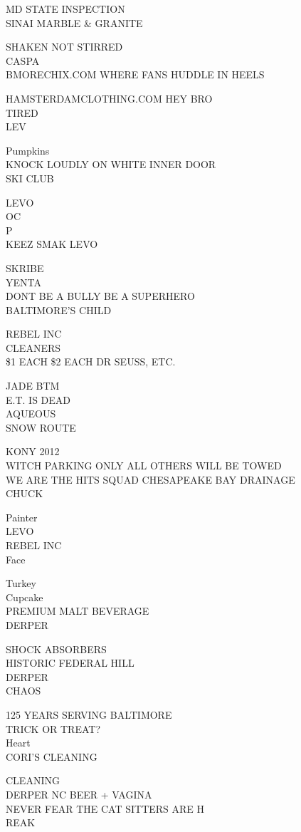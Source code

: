 \documentclass[10pt,letterpaper]{article}
\begin{document}
MD STATE INSPECTION\\
SINAI MARBLE \& GRANITE

SHAKEN NOT STIRRED\\
CASPA\\
BMORECHIX.COM WHERE FANS HUDDLE IN HEELS

HAMSTERDAMCLOTHING.COM HEY BRO\\
TIRED\\
LEV

Pumpkins\\
KNOCK LOUDLY ON WHITE INNER DOOR\\
SKI CLUB

LEVO\\
OC\\
P\\
KEEZ SMAK LEVO

SKRIBE\\
YENTA\\
DONT BE A BULLY BE A SUPERHERO\\
BALTIMORE'S CHILD

REBEL INC\\
CLEANERS\\
\$1 EACH \$2 EACH DR SEUSS, ETC.

JADE BTM\\
E.T. IS DEAD\\
AQUEOUS\\
SNOW ROUTE

KONY 2012\\
WITCH PARKING ONLY ALL OTHERS WILL BE TOWED\\
WE ARE THE HITS SQUAD CHESAPEAKE BAY DRAINAGE\\
CHUCK

Painter\\
LEVO\\
REBEL INC\\
Face

Turkey\\
Cupcake\\
PREMIUM MALT BEVERAGE\\
DERPER

SHOCK ABSORBERS\\
HISTORIC FEDERAL HILL\\
DERPER\\
CHAOS

125 YEARS SERVING BALTIMORE\\
TRICK OR TREAT?\\
Heart\\
CORI'S CLEANING

CLEANING\\
DERPER NC BEER + VAGINA\\
NEVER FEAR THE CAT SITTERS ARE H\\
REAK
\end{document}
